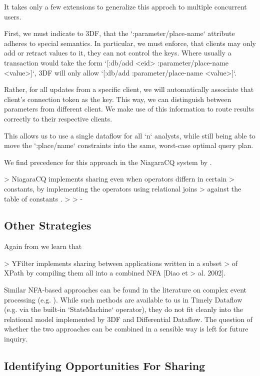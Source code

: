 \documentclass[../catalog.tex]{subfiles}
\begin{document}
It takes only a few extensions to generalize this approch to multiple
concurrent users.

First, we must indicate to 3DF, that the `:parameter/place-name`
attribute adheres to special semantics. In particular, we must
enforce, that clients may only add or retract values to it, they can
not control the keys. Where usually a transaction would take the form
`[:db/add <eid> :parameter/place-name <value>]`, 3DF will only allow
`[:db/add :parameter/place-name <value>]`.

Rather, for all updates from a specific client, we will automatically
associate that client's connection token as the key. This way, we can
distinguish between parameters from different client. We make use of
this information to route results correctly to their respective
clients.

This allows us to use a single dataflow for all `n` analysts, while
still being able to move the `:place/name` constraints into the same,
worst-case optimal query plan.

We find precedence for this approach in the NiagaraCQ system by
\cite{chen2000niagaracq}.

> NiagaraCQ implements sharing even when operators differn in certain
> constants, by implementing the operators using relational joins
> against the table of constants \cite{chen2000niagaracq}.
> 
> - \cite{hirzel2014catalog}

\subsection{Other Strategies}

Again from \cite{hirzel2014catalog} we learn that

> YFilter implements sharing between applications written in a subset
> of XPath by compiling them all into a combined NFA [Diao et
> al. 2002].

Similar NFA-based approaches can be found in the literature on complex
event processing (e.g. \cite{agrawal2008}). While such methods are
available to us in Timely Dataflow (e.g. via the built-in
`StateMachine` operator), they do not fit cleanly into the relational
model implemented by 3DF and Differential Dataflow. The question of
whether the two approaches can be combined in a sensible way is left
for future inquiry.

\subsection{Identifying Opportunities For Sharing}
\end{document}
